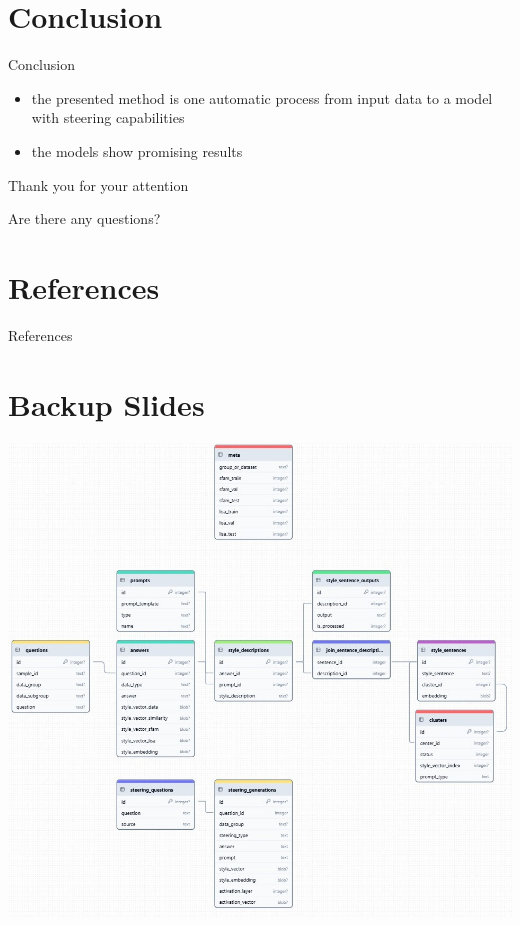 \documentclass[]{beamer}
\begin{document}
\section{Conclusion}
\begin{frame}{Conclusion}
  \begin{itemize}
    \item the presented method is one automatic process from input data to a model with steering capabilities
    \item the models show promising results
  \end{itemize}
\end{frame}


\begin{frame}[c]
  \centering \Large
  Thank you for your attention

  \vspace{0.5em} \large
  Are there any questions?
\end{frame}

\section*{References}
\begin{frame}[allowframebreaks]{References}
  \printbibliography
\end{frame}


\section*{Backup Slides}
\begin{frame}[plain]
  \includegraphics[width=\linewidth]{img/sqlite-db.jpeg}
\end{frame}
\end{document}

